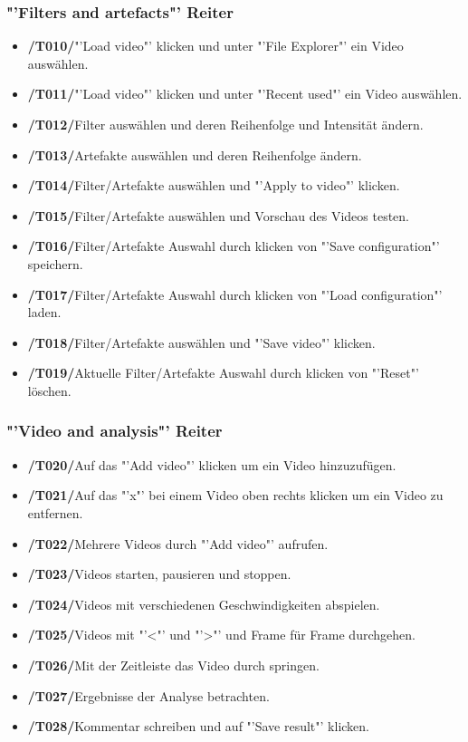 \documentclass[parskip=full]{scrartcl}
\begin{document}
\subsubsection{"'Filters and artefacts"' Reiter}
\begin{itemize}
\item[]\textbf{/T010/}\qquad "'Load video"' klicken und unter "'File Explorer"' ein Video auswählen.
\item[]\textbf{/T011/}\qquad "'Load video"' klicken und unter "'Recent used"' ein Video auswählen.
\item[]\textbf{/T012/}\qquad Filter auswählen und deren Reihenfolge und Intensität ändern.
\item[]\textbf{/T013/}\qquad Artefakte auswählen und deren Reihenfolge  ändern.
\item[]\textbf{/T014/}\qquad Filter/Artefakte auswählen und "'Apply to video"' klicken.
\item[]\textbf{/T015/}\qquad Filter/Artefakte auswählen und Vorschau des Videos testen.
\item[]\textbf{/T016/}\qquad Filter/Artefakte Auswahl durch klicken von "'Save configuration"' speichern.
\item[]\textbf{/T017/}\qquad Filter/Artefakte Auswahl durch klicken von "'Load configuration"' laden.
\item[]\textbf{/T018/}\qquad Filter/Artefakte auswählen und "'Save video"' klicken.
\item[]\textbf{/T019/}\qquad Aktuelle Filter/Artefakte Auswahl durch klicken von "'Reset"' löschen.
\end{itemize}
\subsubsection{"'Video and analysis"' Reiter}
\begin{itemize}
\item[]\textbf{/T020/}\qquad Auf das "'Add video"' klicken um ein Video hinzuzufügen.
\item[]\textbf{/T021/}\qquad Auf das "'x"' bei einem Video oben rechts klicken um ein Video zu entfernen.
\item[]\textbf{/T022/}\qquad Mehrere Videos durch "'Add video"' aufrufen.
\item[]\textbf{/T023/}\qquad Videos starten, pausieren und stoppen.
\item[]\textbf{/T024/}\qquad Videos mit verschiedenen Geschwindigkeiten abspielen.
\item[]\textbf{/T025/}\qquad Videos mit "'<"' und "'>"' und Frame für Frame  durchgehen.
\item[]\textbf{/T026/}\qquad Mit der Zeitleiste das Video durch springen.
\item[]\textbf{/T027/}\qquad Ergebnisse der Analyse betrachten.
\item[]\textbf{/T028/}\qquad Kommentar schreiben und auf "'Save result"' klicken.
\end{itemize}
\end{document}
